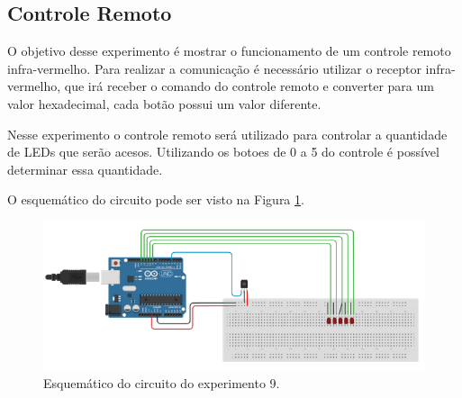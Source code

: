 \documentclass[12pt]{article}
\begin{document}
\subsection{Controle Remoto}
O objetivo desse experimento é mostrar o funcionamento de um controle remoto infra-vermelho. Para realizar a comunicação é necessário utilizar o receptor infra-vermelho, que irá receber o comando do controle remoto e converter para um valor hexadecimal, cada botão possui um valor diferente.

Nesse experimento o controle remoto será utilizado para controlar a quantidade de LEDs que serão acesos. Utilizando os botoes de 0 a 5 do controle é possível determinar essa quantidade.

O esquemático do circuito pode ser visto na Figura \ref{figExp9esq}.

\begin{figure}[H]
	\centering
	\includegraphics[scale=0.6]{Imagens/Experimentos/9-ControleRemoto/esq.png}
	\caption{Esquemático do circuito do experimento 9.}
	\label{figExp9esq}
\end{figure}




\end{document}
